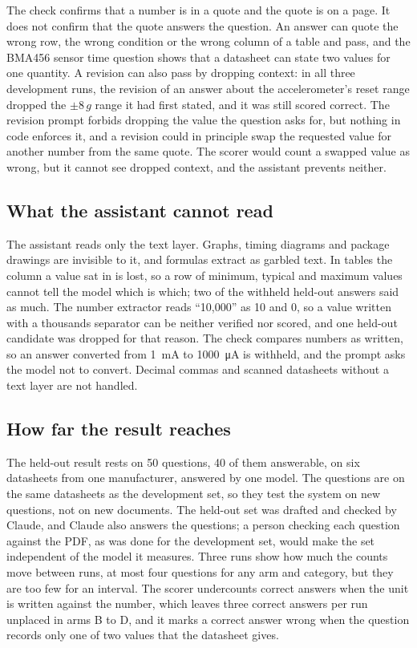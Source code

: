 The check confirms that a number is in a quote and the quote is on a page. It does not confirm that the quote answers the question. An answer can quote the wrong row, the wrong condition or the wrong column of a table and pass, and the BMA456 sensor time question shows that a datasheet can state two values for one quantity. A revision can also pass by dropping context: in all three development runs, the revision of an answer about the accelerometer's reset range dropped the $\pm 8\,g$ range it had first stated, and it was still scored correct. The revision prompt forbids dropping the value the question asks for, but nothing in code enforces it, and a revision could in principle swap the requested value for another number from the same quote. The scorer would count a swapped value as wrong, but it cannot see dropped context, and the assistant prevents neither.

\subsection{What the assistant cannot read}

The assistant reads only the text layer. Graphs, timing diagrams and package drawings are invisible to it, and formulas extract as garbled text. In tables the column a value sat in is lost, so a row of minimum, typical and maximum values cannot tell the model which is which; two of the withheld held-out answers said as much. The number extractor reads \enquote{10,000} as 10 and 0, so a value written with a thousands separator can be neither verified nor scored, and one held-out candidate was dropped for that reason. The check compares numbers as written, so an answer converted from \qty{1}{\milli\ampere} to \qty{1000}{\micro\ampere} is withheld, and the prompt asks the model not to convert. Decimal commas and scanned datasheets without a text layer are not handled.

\subsection{How far the result reaches}

The held-out result rests on 50 questions, 40 of them answerable, on six datasheets from one manufacturer, answered by one model. The questions are on the same datasheets as the development set, so they test the system on new questions, not on new documents. The held-out set was drafted and checked by Claude, and Claude also answers the questions; a person checking each question against the PDF, as was done for the development set, would make the set independent of the model it measures. Three runs show how much the counts move between runs, at most four questions for any arm and category, but they are too few for an interval. The scorer undercounts correct answers when the unit is written against the number, which leaves three correct answers per run unplaced in arms B to D, and it marks a correct answer wrong when the question records only one of two values that the datasheet gives.
